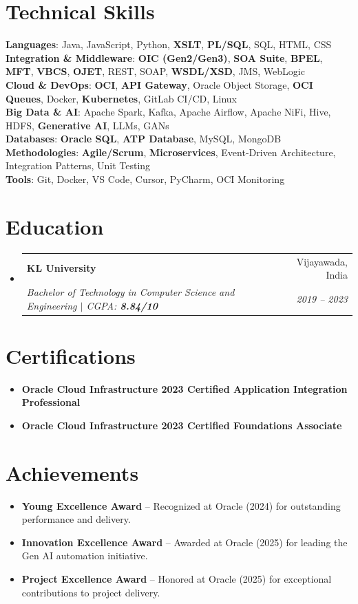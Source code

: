 \documentclass[letterpaper,11pt]{article}
\makeatletter
\newcommand{\resumeItem}[1]{
  \item\small{
    {#1 \vspace{-2pt}}
  }
}
\newcommand{\resumeSubheading}[4]{
  \vspace{-2pt}\item
    \begin{tabular*}{0.97\textwidth}[t]{l@{\extracolsep{\fill}}r}
      \textbf{#1} & #2 \\
      \textit{\small#3} & \textit{\small #4} \\
    \end{tabular*}\vspace{-7pt}
}
\newcommand{\resumeSubHeadingListStart}{\begin{itemize}[leftmargin=0.15in, label={}]}
\newcommand{\resumeSubHeadingListEnd}{\end{itemize}}
\newcommand{\resumeItemListStart}{\begin{itemize}}
\newcommand{\resumeItemListEnd}{\end{itemize}\vspace{-5pt}}
\makeatother
\begin{document}
\section{Technical Skills}
\begin{itemize}[leftmargin=0.15in, label={}]
    \small{\item{
        \textbf{Languages}{: Java, JavaScript, Python, \textbf{XSLT}, \textbf{PL/SQL}, SQL, HTML, CSS} \\
        \textbf{Integration \& Middleware}{: \textbf{OIC (Gen2/Gen3)}, \textbf{SOA Suite}, \textbf{BPEL}, \textbf{MFT}, \textbf{VBCS}, \textbf{OJET}, REST, SOAP, \textbf{WSDL/XSD}, JMS, WebLogic} \\
        \textbf{Cloud \& DevOps}{: \textbf{OCI}, \textbf{API Gateway}, Oracle Object Storage, \textbf{OCI Queues}, Docker, \textbf{Kubernetes}, GitLab CI/CD, Linux} \\
        \textbf{Big Data \& AI}{: Apache Spark, Kafka, Apache Airflow, Apache NiFi, Hive, HDFS, \textbf{Generative AI}, LLMs, GANs} \\
        \textbf{Databases}{: \textbf{Oracle SQL}, \textbf{ATP Database}, MySQL, MongoDB} \\
        \textbf{Methodologies}{: \textbf{Agile/Scrum}, \textbf{Microservices}, Event-Driven Architecture, Integration Patterns, Unit Testing} \\
        \textbf{Tools}{: Git, Docker, VS Code, Cursor, PyCharm, OCI Monitoring}
    }}
\end{itemize}

\section{Education}
\resumeSubHeadingListStart
    \resumeSubheading
        {KL University}{Vijayawada, India}
        {Bachelor of Technology in Computer Science and Engineering $|$ CGPA: \textbf{8.84/10}}{2019 -- 2023}
\resumeSubHeadingListEnd

\section{Certifications}
\resumeItemListStart
    \resumeItem{\textbf{Oracle Cloud Infrastructure 2023 Certified Application Integration Professional}}
    \resumeItem{\textbf{Oracle Cloud Infrastructure 2023 Certified Foundations Associate}}
\resumeItemListEnd

\section{Achievements}
\resumeItemListStart
    \resumeItem{\textbf{Young Excellence Award} -- Recognized at Oracle (2024) for outstanding performance and delivery.}
    \resumeItem{\textbf{Innovation Excellence Award} -- Awarded at Oracle (2025) for leading the Gen AI automation initiative.}
    \resumeItem{\textbf{Project Excellence Award} -- Honored at Oracle (2025) for exceptional contributions to project delivery.}
\resumeItemListEnd
\end{document}
